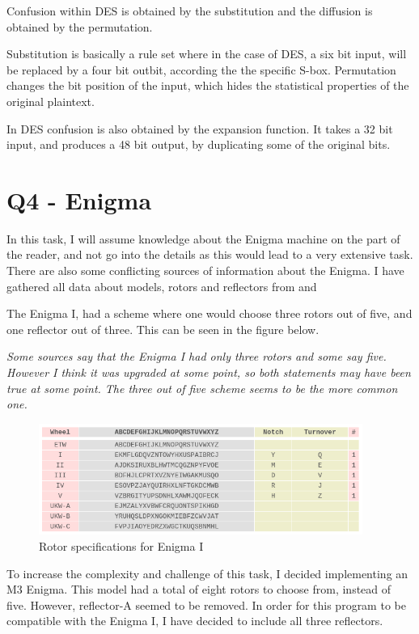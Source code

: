 \documentclass{article}
\begin{document}
Confusion within DES is obtained by the substitution and the diffusion is obtained by the permutation. 

Substitution is basically a rule set where in the case of DES, a six bit input, will be replaced by a four bit outbit, according the the specific S-box.
Permutation changes the bit position of the input, which hides the statistical properties of the original plaintext. 

In DES confusion is also obtained by the expansion function. It takes a 32 bit input, and produces a 48 bit output, by duplicating some of the original bits. 


\section{Q4 - Enigma}

In this task, I will assume knowledge about the Enigma machine on the part of the reader, and not go into the details as this would lead to a very extensive task. There are also some conflicting sources of information about the Enigma. I have gathered all data about models, rotors and reflectors from \cite{ENIGMA1} and \cite{ENIGMA2}

The Enigma I, had a scheme where one would choose three rotors out of five, and one reflector out of three. This can be seen in the figure below. 

\textit{Some sources say that the Enigma I had only three rotors and some say five. However I think it was upgraded at some point, so both statements may have been true at some point. The three out of five scheme seems to be the more common one.}

\begin{figure}[H]
 \centering
  \includegraphics[width=300pt]{img/enigmaIspecs.png}
 \caption{Rotor specifications for Enigma I \cite{ENIGMA2}}
 \end{figure}

To increase the complexity and challenge of this task, I decided implementing an M3 Enigma. This model had a total of eight rotors to choose from, instead of five. However, reflector-A seemed to be removed. In order for this program to be compatible with the Enigma I, I have decided to include all three reflectors. 
\end{document}
